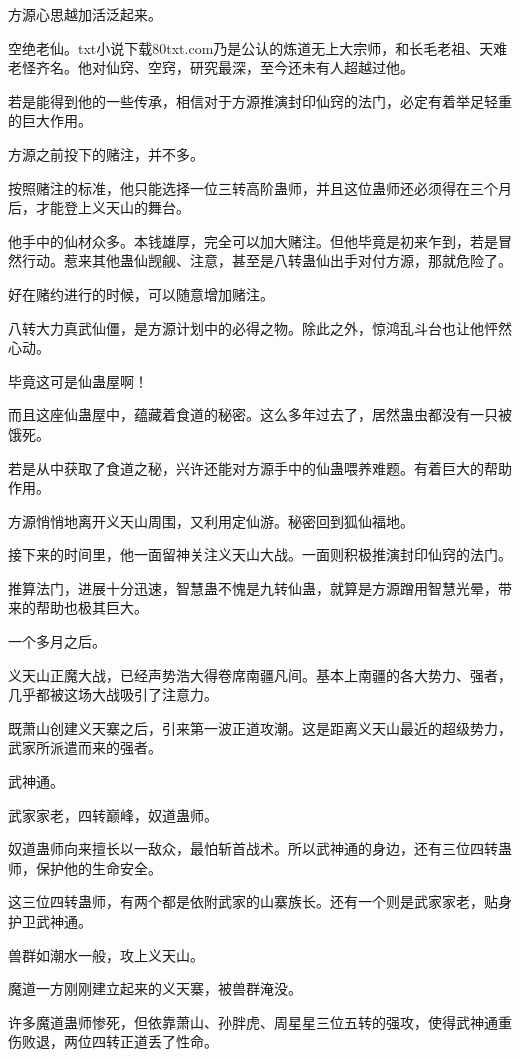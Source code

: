 \begin{this_body}
方源心思越加活泛起来。

空绝老仙。txt小说下载80txt.com乃是公认的炼道无上大宗师，和长毛老祖、天难老怪齐名。他对仙窍、空窍，研究最深，至今还未有人超越过他。

若是能得到他的一些传承，相信对于方源推演封印仙窍的法门，必定有着举足轻重的巨大作用。

方源之前投下的赌注，并不多。

按照赌注的标准，他只能选择一位三转高阶蛊师，并且这位蛊师还必须得在三个月后，才能登上义天山的舞台。

他手中的仙材众多。本钱雄厚，完全可以加大赌注。但他毕竟是初来乍到，若是冒然行动。惹来其他蛊仙觊觎、注意，甚至是八转蛊仙出手对付方源，那就危险了。

好在赌约进行的时候，可以随意增加赌注。

八转大力真武仙僵，是方源计划中的必得之物。除此之外，惊鸿乱斗台也让他怦然心动。

毕竟这可是仙蛊屋啊！

而且这座仙蛊屋中，蕴藏着食道的秘密。这么多年过去了，居然蛊虫都没有一只被饿死。

若是从中获取了食道之秘，兴许还能对方源手中的仙蛊喂养难题。有着巨大的帮助作用。

方源悄悄地离开义天山周围，又利用定仙游。秘密回到狐仙福地。

接下来的时间里，他一面留神关注义天山大战。一面则积极推演封印仙窍的法门。

推算法门，进展十分迅速，智慧蛊不愧是九转仙蛊，就算是方源蹭用智慧光晕，带来的帮助也极其巨大。

一个多月之后。

义天山正魔大战，已经声势浩大得卷席南疆凡间。基本上南疆的各大势力、强者，几乎都被这场大战吸引了注意力。

既萧山创建义天寨之后，引来第一波正道攻潮。这是距离义天山最近的超级势力，武家所派遣而来的强者。

武神通。

武家家老，四转巅峰，奴道蛊师。

奴道蛊师向来擅长以一敌众，最怕斩首战术。所以武神通的身边，还有三位四转蛊师，保护他的生命安全。

这三位四转蛊师，有两个都是依附武家的山寨族长。还有一个则是武家家老，贴身护卫武神通。

兽群如潮水一般，攻上义天山。

魔道一方刚刚建立起来的义天寨，被兽群淹没。

许多魔道蛊师惨死，但依靠萧山、孙胖虎、周星星三位五转的强攻，使得武神通重伤败退，两位四转正道丢了性命。


\end{this_body}
